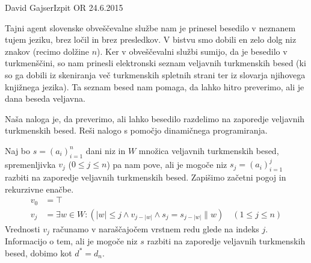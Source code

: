 \begin{naloga}{David Gajser}{Izpit OR 24.6.2015}
\begin{vprasanje}
Tajni agent slovenske obveščevalne službe
nam je prinesel besedilo v neznanem tujem jeziku,
brez ločil in brez presledkov.
V bistvu smo dobili en zelo dolg niz znakov (recimo dolžine $n$).
Ker v obveščevalni službi sumijo, da je besedilo v turkmenščini,
so nam prinesli elektronski seznam veljavnih turkmenskih besed
(ki so ga dobili iz skeniranja več turkmenskih spletnih strani
ter iz slovarja njihovega knjižnega jezika).
Ta seznam besed nam pomaga, da lahko hitro preverimo,
ali je dana beseda veljavna.

Naša naloga je, da preverimo,
ali lahko besedilo razdelimo na zaporedje veljavnih turkmenskih besed.
Reši nalogo s pomočjo dinamičnega programiranja.
\end{vprasanje}

\begin{odgovor}
Naj bo $s = (a_i)_{i=1}^n$ dani niz in $W$ množica veljavnih turkmenskih besed,
spremenljivka $v_j$ ($0 \le j \le n$) pa nam pove,
ali je mogoče niz $s_j = (a_i)_{i=1}^j$
razbiti na zaporedje veljavnih turkmenskih besed.
Zapišimo začetni pogoj in rekurzivne enačbe.
\begin{align*}
v_0 &= \top \\
v_j &= \exists w \in W : (|w| \le j \land v_{j-|w|} \land s_j = s_{j-|w|} \| w)
\quad (1 \le j \le n)
\end{align*}
Vrednosti $v_j$ računamo v naraščajočem vrstnem redu glede na indeks $j$.
Informacijo o tem, ali je mogoče niz $s$
razbiti na zaporedje veljavnih turkmenskih besed,
dobimo kot $d^* = d_n$.
\end{odgovor}
\end{naloga}
